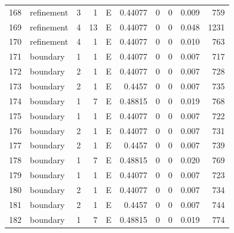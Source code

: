 \begin{longtable}{rlrrrrrrrr}
168 & refinement & 3 & 1 & E & 0.44077 & 0 & 0 & 0.009 & 759 \\
169 & refinement & 4 & 13 & E & 0.44077 & 0 & 0 & 0.048 & 1231 \\
170 & refinement & 4 & 1 & E & 0.44077 & 0 & 0 & 0.010 & 763 \\
171 & boundary & 1 & 1 & E & 0.44077 & 0 & 0 & 0.007 & 717 \\
172 & boundary & 2 & 1 & E & 0.44077 & 0 & 0 & 0.007 & 728 \\
173 & boundary & 2 & 1 & E & 0.4457 & 0 & 0 & 0.007 & 735 \\
174 & boundary & 1 & 7 & E & 0.48815 & 0 & 0 & 0.019 & 768 \\
175 & boundary & 1 & 1 & E & 0.44077 & 0 & 0 & 0.007 & 722 \\
176 & boundary & 2 & 1 & E & 0.44077 & 0 & 0 & 0.007 & 731 \\
177 & boundary & 2 & 1 & E & 0.4457 & 0 & 0 & 0.007 & 739 \\
178 & boundary & 1 & 7 & E & 0.48815 & 0 & 0 & 0.020 & 769 \\
179 & boundary & 1 & 1 & E & 0.44077 & 0 & 0 & 0.007 & 723 \\
180 & boundary & 2 & 1 & E & 0.44077 & 0 & 0 & 0.007 & 734 \\
181 & boundary & 2 & 1 & E & 0.4457 & 0 & 0 & 0.007 & 744 \\
182 & boundary & 1 & 7 & E & 0.48815 & 0 & 0 & 0.019 & 774 \\
\end{longtable}\endgroup

